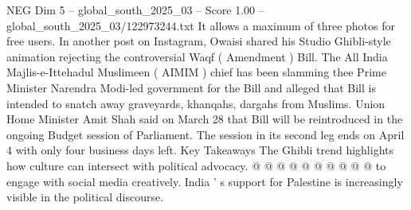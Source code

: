 \begin{textsample}{NEG Dim 5 – global\_south\_2025\_03 – Score 1.00 – global\_south\_2025\_03/122973244.txt}
It allows a maximum of three photos for free users.
In another post on Instagram, Owaisi shared his Studio Ghibli-style animation rejecting the controversial Waqf ( Amendment ) Bill.
The All India Majlis-e-Ittehadul Muslimeen ( AIMIM ) chief has been slamming thee Prime Minister Narendra Modi-led government for the Bill and alleged that Bill is intended to snatch away graveyards, khanqahs, dargahs from Muslims.
Union Home Minister Amit Shah said on March 28 that Bill will be reintroduced in the ongoing Budget session of Parliament.
The session in its second leg ends on April 4 with only four business days left.
Key Takeaways The Ghibli trend highlights how culture can intersect with political advocacy. @ @ @ @ @ @ @ @ @ @ to engage with social media creatively.
India ' s support for Palestine is increasingly visible in the political discourse.

\end{textsample}
